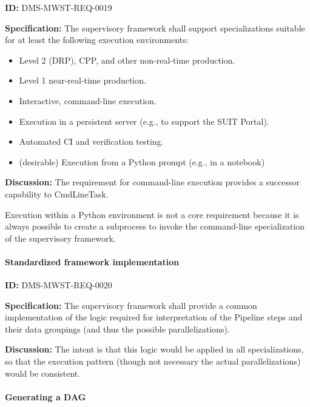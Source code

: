 \documentclass[SE,toc,lsstdraft]{lsstdoc}
\begin{document}
\label{DMS-MWST-REQ-0019}
\textbf{ID:} DMS-MWST-REQ-0019

\textbf{Specification:}
The supervisory framework shall support specializations suitable for at least the following execution environments:

    \begin{itemize}
\item
Level 2 (DRP), CPP, and other non-real-time production.

\item
Level 1 near-real-time production.

\item
Interactive, command-line execution.

\item
Execution in a persistent server (e.g., to support the SUIT Portal).

\item
Automated CI and verification testing.

\item
(desirable) Execution from a Python prompt (e.g., in a notebook)

    \end{itemize}

\textbf{Discussion:}
The requirement for command-line execution provides a successor capability to CmdLineTask.

Execution within a Python environment is not a core requirement because it is always possible to create a subprocess to invoke the command-line specialization of the supervisory framework.

\paragraph{Standardized framework implementation}\hfill  %

\label{DMS-MWST-REQ-0020}
\textbf{ID:} DMS-MWST-REQ-0020

\textbf{Specification:}
The supervisory framework shall provide a common implementation of the logic required for interpretation of the Pipeline steps and their data groupings (and thus the possible parallelizations).

\textbf{Discussion:}
The intent is that this logic would be applied in all specializations, so that the execution pattern (though not necessary the actual parallelizations) would be consistent.

\paragraph{Generating a DAG}\hfill  %
\end{document}
